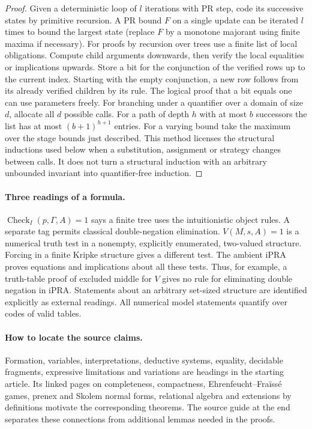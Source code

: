 \begin{proof}
Given a deterministic loop of $l$ iterations with PR step, code its successive states by primitive recursion. A PR bound $F$ on a single update can be iterated $l$ times to bound the largest state (replace $F$ by a monotone majorant using finite maxima if necessary). For proofs by recursion over trees use a finite list of local obligations. Compute child arguments downwards, then verify the local equalities or implications upwards. Store a bit for the conjunction of the verified rows up to the current index. Starting with the empty conjunction, a new row follows from its already verified children by its rule. The logical proof that a bit equals one can use parameters freely. For branching under a quantifier over a domain of size $d$, allocate all $d$ possible calls. For a path of depth $h$ with at most $b$ successors the list has at most $(b+1)^{h+1}$ entries. For a varying bound take the maximum over the stage bounds just described. This method licenses the structural inductions used below when a substitution, assignment or strategy changes between calls. It does not turn a structural induction with an arbitrary unbounded invariant into quantifier-free induction.
\end{proof}

\paragraph{Three readings of a formula.}
$\operatorname{Check}_I(p,\Gamma,A)=1$ says a finite tree uses the intuitionistic object rules. A separate tag permits classical double-negation elimination. $V(M,s,A)=1$ is a numerical truth test in a nonempty, explicitly enumerated, two-valued structure. Forcing in a finite Kripke structure gives a different test. The ambient iPRA proves equations and implications about all these tests. Thus, for example, a truth-table proof of excluded middle for $V$ gives no rule for eliminating double negation in iPRA. Statements about an arbitrary set-sized structure are identified explicitly as external readings. All numerical model statements quantify over codes of valid tables.

\paragraph{How to locate the source claims.}
Formation, variables, interpretations, deductive systems, equality, decidable fragments, expressive limitations and variations are headings in the starting article. Its linked pages on completeness, compactness, Ehrenfeucht--Fraïssé games, prenex and Skolem normal forms, relational algebra and extensions by definitions motivate the corresponding theorems. The source guide at the end separates these connections from additional lemmas needed in the proofs.

